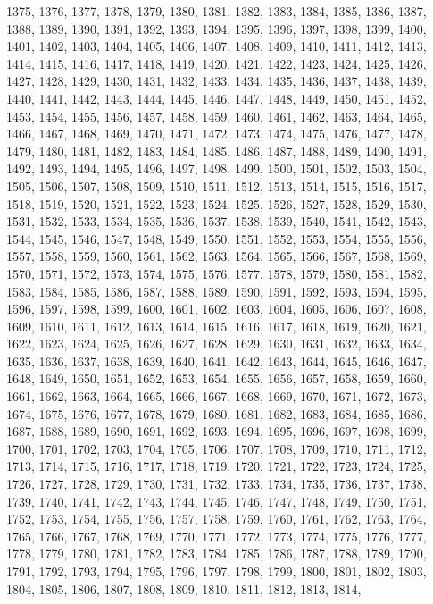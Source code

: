 \documentclass[a4paper,11pt]{article}
\begin{document}
1375, 1376, 1377, 1378, 1379, 1380, 1381, 1382, 1383, 1384, 1385,
1386, 1387, 1388, 1389, 1390, 1391, 1392, 1393, 1394, 1395, 1396,
1397, 1398, 1399, 1400, 1401, 1402, 1403, 1404, 1405, 1406, 1407,
1408, 1409, 1410, 1411, 1412, 1413, 1414, 1415, 1416, 1417, 1418,
1419, 1420, 1421, 1422, 1423, 1424, 1425, 1426, 1427, 1428, 1429,
1430, 1431, 1432, 1433, 1434, 1435, 1436, 1437, 1438, 1439, 1440,
1441, 1442, 1443, 1444, 1445, 1446, 1447, 1448, 1449, 1450, 1451,
1452, 1453, 1454, 1455, 1456, 1457, 1458, 1459, 1460, 1461, 1462,
1463, 1464, 1465, 1466, 1467, 1468, 1469, 1470, 1471, 1472, 1473,
1474, 1475, 1476, 1477, 1478, 1479, 1480, 1481, 1482, 1483, 1484,
1485, 1486, 1487, 1488, 1489, 1490, 1491, 1492, 1493, 1494, 1495,
1496, 1497, 1498, 1499, 1500, 1501, 1502, 1503, 1504, 1505, 1506,
1507, 1508, 1509, 1510, 1511, 1512, 1513, 1514, 1515, 1516, 1517,
1518, 1519, 1520, 1521, 1522, 1523, 1524, 1525, 1526, 1527, 1528,
1529, 1530, 1531, 1532, 1533, 1534, 1535, 1536, 1537, 1538, 1539,
1540, 1541, 1542, 1543, 1544, 1545, 1546, 1547, 1548, 1549, 1550,
1551, 1552, 1553, 1554, 1555, 1556, 1557, 1558, 1559, 1560, 1561,
1562, 1563, 1564, 1565, 1566, 1567, 1568, 1569, 1570, 1571, 1572,
1573, 1574, 1575, 1576, 1577, 1578, 1579, 1580, 1581, 1582, 1583,
1584, 1585, 1586, 1587, 1588, 1589, 1590, 1591, 1592, 1593, 1594,
1595, 1596, 1597, 1598, 1599, 1600, 1601, 1602, 1603, 1604, 1605,
1606, 1607, 1608, 1609, 1610, 1611, 1612, 1613, 1614, 1615, 1616,
1617, 1618, 1619, 1620, 1621, 1622, 1623, 1624, 1625, 1626, 1627,
1628, 1629, 1630, 1631, 1632, 1633, 1634, 1635, 1636, 1637, 1638,
1639, 1640, 1641, 1642, 1643, 1644, 1645, 1646, 1647, 1648, 1649,
1650, 1651, 1652, 1653, 1654, 1655, 1656, 1657, 1658, 1659, 1660,
1661, 1662, 1663, 1664, 1665, 1666, 1667, 1668, 1669, 1670, 1671,
1672, 1673, 1674, 1675, 1676, 1677, 1678, 1679, 1680, 1681, 1682,
1683, 1684, 1685, 1686, 1687, 1688, 1689, 1690, 1691, 1692, 1693,
1694, 1695, 1696, 1697, 1698, 1699, 1700, 1701, 1702, 1703, 1704,
1705, 1706, 1707, 1708, 1709, 1710, 1711, 1712, 1713, 1714, 1715,
1716, 1717, 1718, 1719, 1720, 1721, 1722, 1723, 1724, 1725, 1726,
1727, 1728, 1729, 1730, 1731, 1732, 1733, 1734, 1735, 1736, 1737,
1738, 1739, 1740, 1741, 1742, 1743, 1744, 1745, 1746, 1747, 1748,
1749, 1750, 1751, 1752, 1753, 1754, 1755, 1756, 1757, 1758, 1759,
1760, 1761, 1762, 1763, 1764, 1765, 1766, 1767, 1768, 1769, 1770,
1771, 1772, 1773, 1774, 1775, 1776, 1777, 1778, 1779, 1780, 1781,
1782, 1783, 1784, 1785, 1786, 1787, 1788, 1789, 1790, 1791, 1792,
1793, 1794, 1795, 1796, 1797, 1798, 1799, 1800, 1801, 1802, 1803,
1804, 1805, 1806, 1807, 1808, 1809, 1810, 1811, 1812, 1813, 1814,
\end{document}

